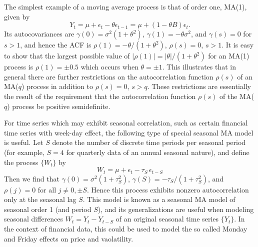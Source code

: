 \begin{ex}\label{ex:movingorder1}
The simplest example of a moving average process is that of order one, MA(1), given by
	\[
	Y_t = \mu + \epsilon_t - \theta \epsilon_{t-1}= \mu + (1 - \theta B) \epsilon_t.
	 \]
Its autocovariances are $\gamma(0)= \sigma^2(1+\theta^2)$, $\gamma(1)= -\theta \sigma^2$, and $\gamma(s)=0$ for $s>1$, and hence the ACF is $\rho(1)= -\theta /(1+\theta^2)$, $\rho(s)=0$, $s>1$. It is easy to show that the largest possible value of $\lvert\rho(1)\rvert= \lvert\theta\rvert / (1+\theta^2)$ for an  MA(1) process is $\rho(1)=\pm 0.5$ which occurs when $\theta = \pm 1$. This illustrates that in general there are further restrictions on the autocorrelation function $\rho(s)$ of an MA($q$)  process in addition to $\rho(s)=0$, $s>q$. These restrictions are essentially the result of the requirement that the autocorrelation function $\rho(s)$ of the MA($q$) process be positive semidefinite.
\end{ex}
    

\begin{ex}\label{ex:seasonal} 
For time series which may exhibit seasonal correlation, such as certain financial time series with week-day effect, the following type of special seasonal MA model is useful. Let $S$ denote the number of discrete time periods per seasonal period (for example, $S=4$ for quarterly data of an annual seasonal nature), and define the process $\{W_t\}$ by
	\[	
	W_t = \mu + \epsilon_t - \tau_S \, \epsilon_{t-S}
	\]
Then we find that $\gamma(0)= \sigma^2(1+\tau_S^2)$, $\gamma(S) = - \tau_S / (1+\tau_S^2)$,  and $\rho(j)=0$ for all $j \neq 0, \pm S$. Hence this process exhibits nonzero autocorrelation only at the seasonal lag $S$. This model is known as a seasonal MA model of seasonal order 1 (and period $S$), and its generalizations are useful when modeling seasonal differences $W_t = Y_t - Y_{t-S}$ of an original seasonal time series $\{Y_t\}$.  In the context of financial data, this could be used to model the so called Monday and Friday effects on price and vaolatility.
\end{ex}      


